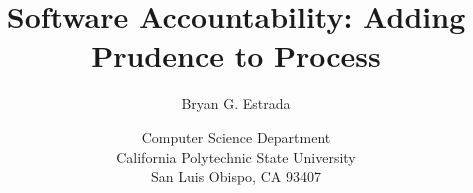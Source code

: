 \documentclass[10pt]{article}
\begin{document}
\title{Software Accountability: Adding Prudence to Process}
\author{Bryan G. Estrada}
\date{Computer Science Department \\
      California Polytechnic State University \\
      San Luis Obispo, CA  93407}

\maketitle








\newpage


\end{document}
